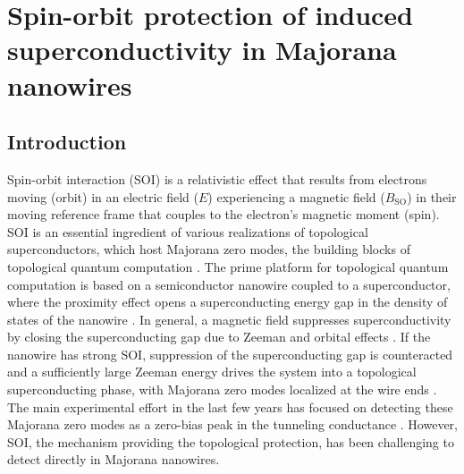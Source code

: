 \chapter{Spin-orbit protection of induced superconductivity in Majorana nanowires}
\label{ch:spinorbit}


\newpage
\noindent
\section{Introduction}

Spin-orbit interaction (SOI) is a relativistic effect that results from electrons moving (orbit) in an electric field ($E$) experiencing a magnetic field ($B_{\mathrm{SO}}$) in their moving reference frame that couples to the electron's magnetic moment (spin).
SOI is an essential ingredient of various realizations of topological superconductors, which host Majorana zero modes, the building blocks of topological quantum computation \cite{Kitaev2001,Fu2008,Nayak2008}.
The prime platform for topological quantum computation is based on a semiconductor nanowire coupled to a superconductor, where the proximity effect opens a superconducting energy gap in the density of states of the nanowire \cite{Lutchyn2010,Oreg2010}.
In general, a magnetic field suppresses superconductivity by closing the superconducting gap due to Zeeman and orbital effects \cite{Nijholt2016}.
If the nanowire has strong SOI, suppression of the superconducting gap is counteracted and a sufficiently large Zeeman energy drives the system into a topological superconducting phase, with Majorana zero modes localized at the wire ends \cite{Lutchyn2010,Oreg2010}.
The main experimental effort in the last few years has focused on detecting these Majorana zero modes as a zero-bias peak in the tunneling conductance \cite{Mourik2012,Albrecht2016,Deng2016,Guel2018,Zhang2018,Lutchyn2018,Aguado2017}.
However, SOI, the mechanism providing the topological protection, has been challenging to detect directly in Majorana nanowires.

